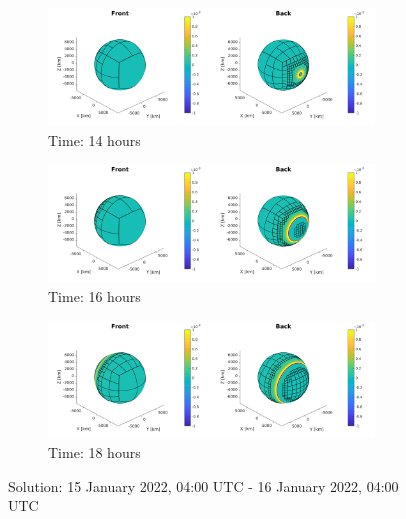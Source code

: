 \documentclass[twoside]{bsu-ms}
\begin{document}
\medskip

\begin{figure}[!htbp]\ContinuedFloat
\vspace{-15pt}
\centering

\begin{subfigure}{\textwidth}
  \centering
  \includegraphics[width=0.95\textwidth,clip=True,trim=4cm 0cm 4cm 0cm]{images/ideal/ideal_28.png}
  \caption{Time: 14 hours }
\end{subfigure}

\medskip

\begin{subfigure}{\textwidth}
  \centering
  \includegraphics[width=0.95\textwidth,clip=True,trim=4cm 0cm 4cm 0cm]{images/ideal/ideal_32.png}
  \caption{Time: 16 hours }
\end{subfigure}

\medskip

\begin{subfigure}{\textwidth}
  \centering
  \includegraphics[width=0.95\textwidth,clip=True,trim=4cm 0cm 4cm 0cm]{images/ideal/ideal_36.png}
  \caption{Time: 18 hours }
\end{subfigure}

\caption{Solution: 15 January 2022, 04:00 $\mathrm{UTC}$ - 16 January 2022, 04:00 $\mathrm{UTC}$}
\end{figure}
\end{document}
